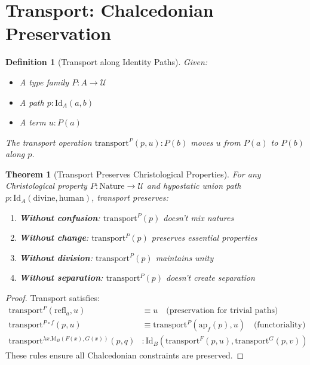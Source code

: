 \documentclass{article}
\newtheorem{theorem}{Theorem}
\newtheorem{definition}{Definition}
\begin{document}
\section{Transport: Chalcedonian Preservation}

\begin{definition}[Transport along Identity Paths]
Given:
\begin{itemize}
    \item A type family $P : A \to \mathcal{U}$
    \item A path $p : \mathrm{Id}_A(a, b)$
    \item A term $u : P(a)$
\end{itemize}
The transport operation $\mathrm{transport}^P(p, u) : P(b)$ moves $u$ from $P(a)$ to $P(b)$ along $p$.
\end{definition}

\begin{theorem}[Transport Preserves Christological Properties]
For any Christological property $P : \text{Nature} \to \mathcal{U}$ and hypostatic union path $p : \mathrm{Id}_A(\text{divine}, \text{human})$, transport preserves:
\begin{enumerate}
    \item \textbf{Without confusion}: $\mathrm{transport}^P(p)$ doesn't mix natures
    \item \textbf{Without change}: $\mathrm{transport}^P(p)$ preserves essential properties
    \item \textbf{Without division}: $\mathrm{transport}^P(p)$ maintains unity
    \item \textbf{Without separation}: $\mathrm{transport}^P(p)$ doesn't create separation
\end{enumerate}
\end{theorem}

\begin{proof}
Transport satisfies:
\begin{align*}
\mathrm{transport}^P(\mathrm{refl}_a, u) &\equiv u \quad \text{(preservation for trivial paths)} \\
\mathrm{transport}^{P \circ f}(p, u) &\equiv \mathrm{transport}^P(\mathrm{ap}_f(p), u) \quad \text{(functoriality)} \\
\mathrm{transport}^{\lambda x. \mathrm{Id}_B(F(x), G(x))}(p, q) &: \mathrm{Id}_B(\mathrm{transport}^F(p, u), \mathrm{transport}^G(p, v))
\end{align*}
These rules ensure all Chalcedonian constraints are preserved.
\end{proof}
\end{document}
